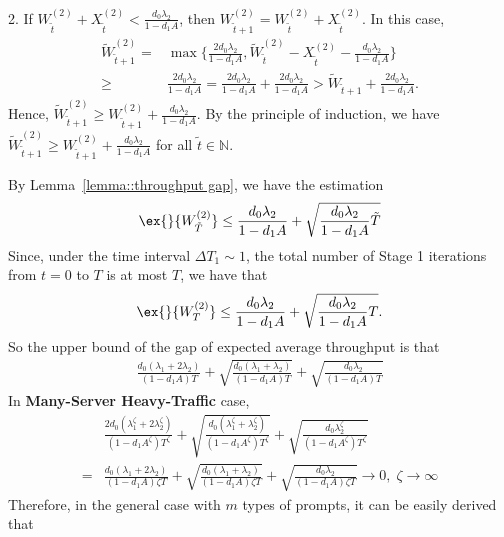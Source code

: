 \documentclass[opre, nonblindrev]{informs3} %
\begin{document}
2. If $W_{\tilde{t}}^{(2)} + X_{\tilde{t}}^{(2)} < \frac{d_0\lambda_2}{1-d_1A}$, then ${W}_{\tilde{t}+1}^{(2)} = {W}_{\tilde{t}}^{(2)}+X_{\tilde{t}}^{(2)}$. In this case,
\begin{align*}
    \tilde{W}_{\tilde{t}+1}^{(2)}=&\max\{\frac{2d_0 \lambda_2}{1-d_1 A},\tilde{W}_{\tilde{t}}^{(2)}-X_{\tilde{t}}^{(2)}-\frac{d_0\lambda_2}{1-d_1A}\}\\\geq& \frac{2d_0 \lambda_2}{1-d_1 A} = \frac{2d_0 \lambda_2}{1-d_1 A}+\frac{2d_0 \lambda_2}{1-d_1 A}>\tilde{W}_{\tilde{t}+1}+\frac{2d_0 \lambda_2}{1-d_1 A}.
\end{align*}
Hence, $\tilde{W}_{\tilde{t}+1}^{(2)} \geq W_{\tilde{t}+1}^{(2)}  + \frac{d_0 \lambda_2}{1-d_1 A}$. By the principle of induction, we have $\tilde{W}_{\tilde{t}+1}^{(2)} \geq W_{\tilde{t}+1}^{(2)}  + \frac{d_0 \lambda_2}{1-d_1 A}$ for all $\tilde{t} \in \mathbb{N}$.

By Lemma~\ref{lemma::throughput gap}, we have the estimation
\begin{align*}
    \ex{}{W_{\tilde{T}}^{(2)}}\leq \frac{d_0 \lambda_2}{1-d_1 A}+\sqrt{\frac{d_0 \lambda_2}{1-d_1 A}\tilde{T}}
\end{align*}
Since, under the time interval $\Delta T_{1} \sim 1$, the total number of Stage 1 iterations from $t = 0$ to $T$ is at most $T$, we have that 
\begin{align*}
    \ex{}{W_{T}^{(2)}}\leq \frac{d_0 \lambda_2}{1-d_1 A}+\sqrt{\frac{d_0 \lambda_2}{1-d_1 A}T}.
\end{align*}
So the upper bound of the gap of expected average throughput is that 
\begin{align*}
    \frac{d_0 (\lambda_1+2\lambda_2)}{(1-d_1 A)T}+\sqrt{\frac{d_0 (\lambda_1+\lambda_2)}{(1-d_1 A)T}}+\sqrt{\frac{d_0 \lambda_2}{(1-d_1 A)T}}
\end{align*}
In \textbf{Many-Server Heavy-Traffic} case,
\begin{align*}
&\frac{2d_0 (\lambda_1^{\zeta}+2\lambda_2^{\zeta})}{(1-d_1 A^{\zeta})T^{\zeta}}+\sqrt{\frac{d_0 (\lambda_1^{\zeta}+\lambda_2^{\zeta})}{(1-d_1 A^{\zeta})T^{\zeta}}}+\sqrt{\frac{d_0 \lambda_2^{\zeta}}{(1-d_1 A^{\zeta})T^{\zeta}}}\\
=&\frac{d_0 (\lambda_1+2\lambda_2)}{(1-d_1 A)\zeta T}+\sqrt{\frac{d_0 (\lambda_1+\lambda_2)}{(1-d_1 A)\zeta T}}+\sqrt{\frac{d_0 \lambda_2}{(1-d_1 A)\zeta T}}\to 0,\; \zeta \to \infty
\end{align*}
Therefore, in the general case with $m$ types of prompts, it can be easily derived that
\end{document}

